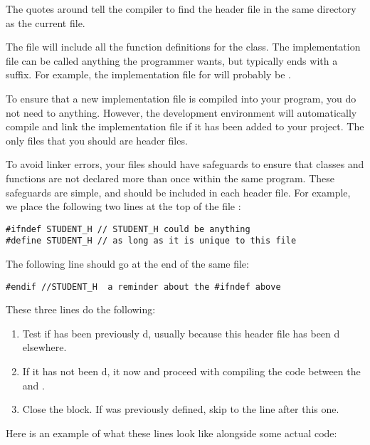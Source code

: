 The quotes around  tell the compiler to find the header file in the same directory as the current file.

The  file will include all the function definitions for the  class. 
The implementation file can be called anything the programmer wants, but typically ends with a  suffix. 
For example, the implementation file for  will probably be .

To ensure that a new implementation file is compiled into your program, you do not need to  anything. 
However, the development environment will automatically compile and link the implementation file if it has been added to your project.
The only files that you should  are header files. 

To avoid linker errors, your files should have safeguards to ensure that classes and functions are not declared more than once within the same program. 
These safeguards are simple, and should be included in each header file. 
For example, we place the following two lines at the top of the file :

\begin{lstlisting}
#ifndef STUDENT_H // STUDENT_H could be anything 
#define STUDENT_H // as long as it is unique to this file
\end{lstlisting}

The following line should go at the end of the same file:

\begin{lstlisting}
#endif //STUDENT_H  a reminder about the #ifndef above 
\end{lstlisting}

These three lines do the following:

\begin{enumerate}
\item Test if  has been previously d, usually because this header file has been d elsewhere.
\item If it has not been d,  it now and proceed with compiling the code between the  and .
\item Close the  block. If  was previously defined, skip to the line after this one.
\end{enumerate}

Here is an example of what these lines look like alongside some actual code:

